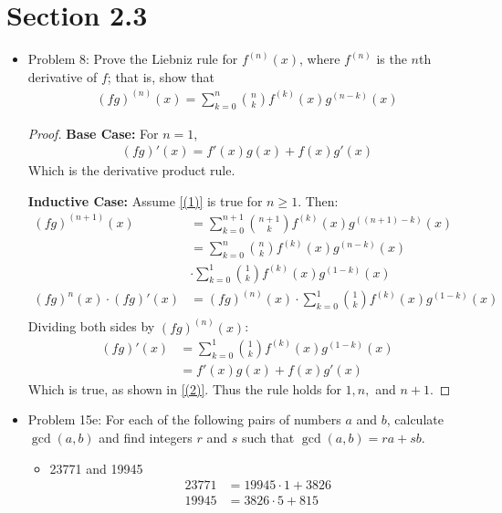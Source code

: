 \documentclass[a4paper,17pt]{extarticle}
\title{\scalebox{1.3}{Math 431 Homework 2}}
\author{\scalebox{1.4}{Theo Koss}}
\date{September 2022}
\theoremstyle{definition}
\renewcommand{\skip}{\par\null\par}
\renewcommand{\geq}{\geqslant}
\begin{document}
\maketitle
\section{Section 2.3}
\begin{itemize}
    \item Problem 8: Prove the Liebniz rule for $f^{(n)}(x)$, where $f^{(n)}$ is the $n$th derivative of $f$; that is, show that\begin{align}\label{(1)}
        (fg)^{(n)}(x)=\sum_{k=0}^n{n\choose k}f^{(k)}(x)g^{(n-k)}(x)
    \end{align}
    \begin{proof}
    \textbf{Base Case:} For $n=1$, \begin{align}\label{(2)}
        (fg)'(x)=f'(x)g(x)+f(x)g'(x) \end{align} Which is the derivative product rule.\skip\textbf{Inductive Case:} Assume \ref{(1)} is true for $n\geq1$. Then: \begin{align}
        (fg)^{(n+1)}(x)&=\sum_{k=0}^{n+1}{{n+1}\choose k}f^{(k)}(x)g^{((n+1)-k)}(x)\\
        &=\sum_{k=0}^n{n\choose k}f^{(k)}(x)g^{(n-k)}(x)\\&\cdot\sum_{k=0}^1{1\choose k}f^{(k)}(x)g^{(1-k)}(x)\\
        (fg)^n(x)\cdot(fg)'(x)&=(fg)^{(n)}(x)\cdot\sum_{k=0}^1{1\choose k}f^{(k)}(x)g^{(1-k)}(x)\\
    \end{align}
    Dividing both sides by $(fg)^{(n)}(x)$:\begin{align}
        (fg)'(x)&=\sum_{k=0}^1{1\choose k}f^{(k)}(x)g^{(1-k)}(x)\\
        &=f'(x)g(x)+f(x)g'(x)
    \end{align}Which is true, as shown in \ref{(2)}. Thus the rule holds for $1,n,$ and $n+1$.
    \end{proof}
    \item Problem 15e: For each of the following pairs of numbers $a$ and $b$, calculate $\gcd(a, b)$ and find integers $r$ and $s$ such that $\gcd(a, b) = ra + sb$.\begin{itemize}[label=(e)]
        \item 23771 and 19945\begin{align*}
            23771&=19945\cdot1+3826\\
            19945&=3826\cdot5+815\\

\end{align*}
\end{itemize}
\end{itemize}
\end{document}
